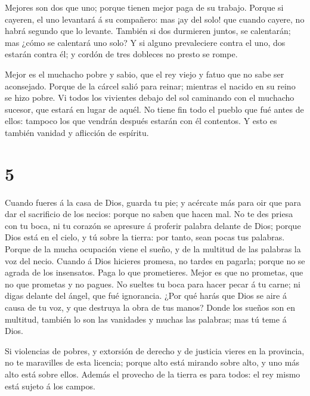  Mejores son dos que uno; porque tienen mejor paga de su
trabajo.  Porque si cayeren, el uno levantará á su
compañero: mas ¡ay del solo! que cuando cayere, no habrá segundo que lo
levante.  También si dos durmieren juntos, se calentarán;
mas ¿cómo se calentará uno solo?  Y si alguno prevaleciere
contra el uno, dos estarán contra él; y cordón de tres dobleces no
presto se rompe.

 Mejor es el muchacho pobre y sabio, que el rey viejo y
fatuo que no sabe ser aconsejado.  Porque de la cárcel
salió para reinar; mientras el nacido en su reino se hizo pobre.
 Vi todos los vivientes debajo del sol caminando con el
muchacho sucesor, que estará en lugar de aquél.  No tiene
fin todo el pueblo que fué antes de ellos: tampoco los que vendrán
después estarán con él contentos. Y esto es también vanidad y aflicción
de espíritu.

\hypertarget{section-4}{%
\section{5}\label{section-4}}

 Cuando fueres á la casa de Dios, guarda tu pie; y acércate
más para oir que para dar el sacrificio de los necios: porque no saben
que hacen mal.  No te des priesa con tu boca, ni tu corazón
se apresure á proferir palabra delante de Dios; porque Dios está en el
cielo, y tú sobre la tierra: por tanto, sean pocas tus palabras.
 Porque de la mucha ocupación viene el sueño, y de la
multitud de las palabras la voz del necio.  Cuando á Dios
hicieres promesa, no tardes en pagarla; porque no se agrada de los
insensatos. Paga lo que prometieres.  Mejor es que no
prometas, que no que prometas y no pagues.  No sueltes tu
boca para hacer pecar á tu carne; ni digas delante del ángel, que fué
ignorancia. ¿Por qué harás que Dios se aire á causa de tu voz, y que
destruya la obra de tus manos?  Donde los sueños son en
multitud, también lo son las vanidades y muchas las palabras; mas tú
teme á Dios.

 Si violencias de pobres, y extorsión de derecho y de
justicia vieres en la provincia, no te maravilles de esta licencia;
porque alto está mirando sobre alto, y uno más alto está sobre ellos.
 Además el provecho de la tierra es para todos: el rey mismo
está sujeto á los campos.

